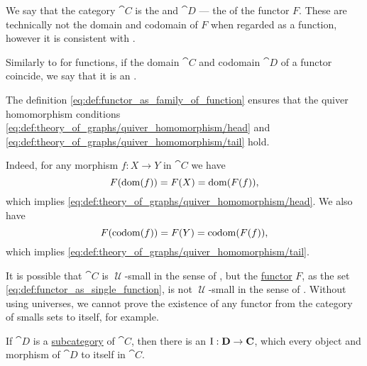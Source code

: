\begin{definition}
  \begin{thmenum}[resume=def:functor]
     We say that the category \( \cat{C} \) is the  and \( \cat{D} \) --- the  of the functor \( F \). These are technically not the domain and codomain of \( F \) when regarded as a function, however it is consistent with .

     Similarly to  for functions, if the domain \( \cat{C} \) and codomain \( \cat{D} \) of a functor coincide, we say that it is an .
  \end{thmenum}
\end{definition}
\begin{defproof}
  The definition \eqref{eq:def:functor_as_family_of_function} ensures that the quiver homomorphism conditions \eqref{eq:def:theory_of_graphs/quiver_homomorphism/head} and \eqref{eq:def:theory_of_graphs/quiver_homomorphism/tail} hold.

  Indeed, for any morphism \( f: X \to Y \) in \( \cat{C} \) we have
  \begin{equation*}
    F(\operatorname{dom}(f)) = F(X) = \operatorname{dom}(F(f)),
  \end{equation*}
  which implies \eqref{eq:def:theory_of_graphs/quiver_homomorphism/head}. We also have
  \begin{equation*}
    F(\operatorname*{co\negthinspace\operatorname{dom}}(f)) = F(Y) = \operatorname*{co\negthinspace\operatorname{dom}}(F(f)),
  \end{equation*}
  which implies \eqref{eq:def:theory_of_graphs/quiver_homomorphism/tail}.
\end{defproof}

\begin{remark}\label{rem:functor_size}
  It is possible that \( \cat{C} \) is \( \mscrU \)-small in the sense of , but the \hyperref[def:functor]{functor} \( F \), as the set \eqref{eq:def:functor_as_single_function}, is not \( \mscrU \)-small in the sense of . Without using universes, we cannot prove the existence of any functor from the category of smalls sets to itself, for example.
\end{remark}

\begin{example}\label{ex:inclusion_functor}
  If \( \cat{D} \) is a \hyperref[def:subcategory]{subcategory} of \( \cat{C} \), then there is an  \( \operatorname{I}: \operatorname{\mathbf{D}} \to \operatorname{\mathbf{C}} \), which every object and morphism of \( \cat{D} \) to itself in \( \cat{C} \).
\end{example}

